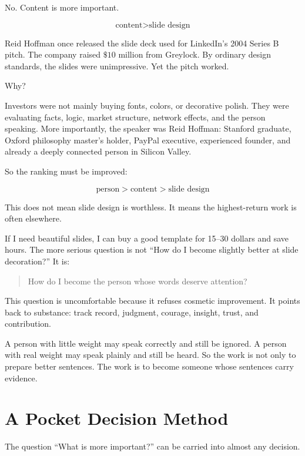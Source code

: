 No. Content is more important.

\[
\text{content} > \text{slide design}
\]

Reid Hoffman once released the slide deck used for LinkedIn's 2004 Series B pitch. The company raised \(\$10\) million from Greylock. By ordinary design standards, the slides were unimpressive. Yet the pitch worked.

Why?

Investors were not mainly buying fonts, colors, or decorative polish. They were evaluating facts, logic, market structure, network effects, and the person speaking. More importantly, the speaker was Reid Hoffman: Stanford graduate, Oxford philosophy master's holder, PayPal executive, experienced founder, and already a deeply connected person in Silicon Valley.

So the ranking must be improved:

\[
\text{person} > \text{content} > \text{slide design}
\]

This does not mean slide design is worthless. It means the highest-return work is often elsewhere.

If I need beautiful slides, I can buy a good template for 15--30 dollars and save hours. The more serious question is not ``How do I become slightly better at slide decoration?'' It is:

\begin{quote}
How do I become the person whose words deserve attention?
\end{quote}

This question is uncomfortable because it refuses cosmetic improvement. It points back to substance: track record, judgment, courage, insight, trust, and contribution.

A person with little weight may speak correctly and still be ignored. A person with real weight may speak plainly and still be heard. So the work is not only to prepare better sentences. The work is to become someone whose sentences carry evidence.

\section*{A Pocket Decision Method}

The question ``What is more important?'' can be carried into almost any decision.


